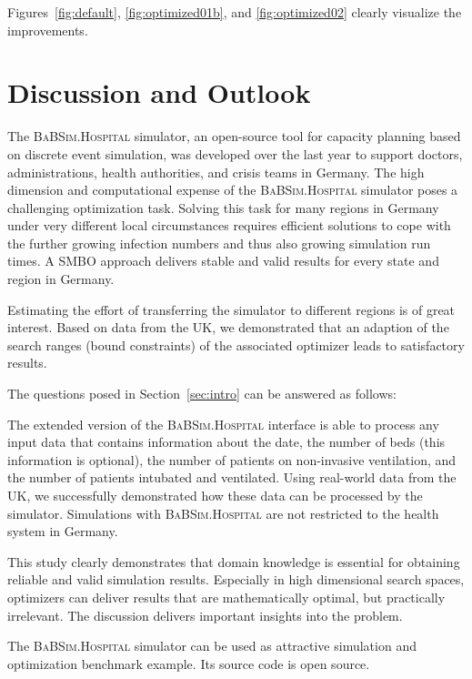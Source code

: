 \documentclass[conference]{IEEEtran}
\newcommand{\babsimhospital}{\textsc{BaBSim.Hospital}\xspace}
\begin{document}
Figures~\ref{fig:default}, \ref{fig:optimized01b}, and \ref{fig:optimized02} clearly visualize the improvements.


\section{Discussion and Outlook}\label{sec:discussion}
The \babsimhospital simulator, an open-source tool for capacity planning based on discrete event simulation,  was developed over the last year to support doctors, administrations, health authorities, and crisis teams in Germany.
The high dimension and computational expense of the \babsimhospital simulator 
poses a challenging optimization task. 
Solving this task for many regions in Germany under very different local circumstances requires 
efficient solutions to cope with the further growing infection numbers and thus also growing simulation run times. 
A \gls{SMBO} approach delivers stable and valid results for every state and region in Germany.

Estimating the effort of transferring the simulator to different regions is of great interest. 
Based on data from the UK, we demonstrated that an adaption of the search ranges (bound constraints) of the associated optimizer leads to satisfactory results. 

The questions posed in Section~\ref{sec:intro} can be answered as follows:
\begin{compactenum}[(Q-1)]
\item The extended version of the \babsimhospital interface is able to process any input data that contains information about the date, the number of beds (this information is optional), the number of patients on non-invasive ventilation, and the number of patients intubated and ventilated. Using real-world data from the UK, we successfully demonstrated how these data can be processed by the simulator. Simulations with \babsimhospital are not restricted to the health system in Germany.
\item This study clearly demonstrates that domain knowledge is essential for obtaining reliable and valid simulation results. Especially in high dimensional search spaces, optimizers can deliver results that are mathematically optimal, but practically irrelevant. The discussion delivers important insights into the problem. 
\end{compactenum}
The \babsimhospital simulator can be used as attractive simulation and optimization benchmark example. Its source code is open source. 





\end{document}
